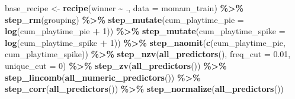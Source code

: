 \documentclass[
]{article}
\newenvironment{Shaded}{\begin{snugshade}}{\end{snugshade}}
\newcommand{\AttributeTok}[1]{\textcolor[rgb]{0.13,0.29,0.53}{#1}}
\newcommand{\DecValTok}[1]{\textcolor[rgb]{0.00,0.00,0.81}{#1}}
\newcommand{\FloatTok}[1]{\textcolor[rgb]{0.00,0.00,0.81}{#1}}
\newcommand{\FunctionTok}[1]{\textcolor[rgb]{0.13,0.29,0.53}{\textbf{#1}}}
\newcommand{\NormalTok}[1]{#1}
\newcommand{\OtherTok}[1]{\textcolor[rgb]{0.56,0.35,0.01}{#1}}
\newcommand{\SpecialCharTok}[1]{\textcolor[rgb]{0.81,0.36,0.00}{\textbf{#1}}}
\begin{document}
\begin{Shaded}
\begin{Highlighting}[]
\NormalTok{base\_recipe }\OtherTok{\textless{}{-}} \FunctionTok{recipe}\NormalTok{(winner }\SpecialCharTok{\textasciitilde{}}\NormalTok{ ., }\AttributeTok{data =}\NormalTok{ momam\_train) }\SpecialCharTok{\%\textgreater{}\%}
  \FunctionTok{step\_rm}\NormalTok{(grouping) }\SpecialCharTok{\%\textgreater{}\%}
  \FunctionTok{step\_mutate}\NormalTok{(}\AttributeTok{cum\_playtime\_pie =} \FunctionTok{log}\NormalTok{(cum\_playtime\_pie }\SpecialCharTok{+} \DecValTok{1}\NormalTok{)) }\SpecialCharTok{\%\textgreater{}\%}
  \FunctionTok{step\_mutate}\NormalTok{(}\AttributeTok{cum\_playtime\_spike =} \FunctionTok{log}\NormalTok{(cum\_playtime\_spike }\SpecialCharTok{+} \DecValTok{1}\NormalTok{)) }\SpecialCharTok{\%\textgreater{}\%}
  \FunctionTok{step\_naomit}\NormalTok{(}\FunctionTok{c}\NormalTok{(cum\_playtime\_pie, cum\_playtime\_spike)) }\SpecialCharTok{\%\textgreater{}\%}
  \FunctionTok{step\_nzv}\NormalTok{(}\FunctionTok{all\_predictors}\NormalTok{(), }\AttributeTok{freq\_cut =} \FloatTok{0.01}\NormalTok{, }\AttributeTok{unique\_cut =} \DecValTok{0}\NormalTok{) }\SpecialCharTok{\%\textgreater{}\%}
  \FunctionTok{step\_zv}\NormalTok{(}\FunctionTok{all\_predictors}\NormalTok{()) }\SpecialCharTok{\%\textgreater{}\%}
  \FunctionTok{step\_lincomb}\NormalTok{(}\FunctionTok{all\_numeric\_predictors}\NormalTok{()) }\SpecialCharTok{\%\textgreater{}\%}
  \FunctionTok{step\_corr}\NormalTok{(}\FunctionTok{all\_predictors}\NormalTok{()) }\SpecialCharTok{\%\textgreater{}\%}
  \FunctionTok{step\_normalize}\NormalTok{(}\FunctionTok{all\_predictors}\NormalTok{())}


\end{Highlighting}
\end{Shaded}
\end{document}
